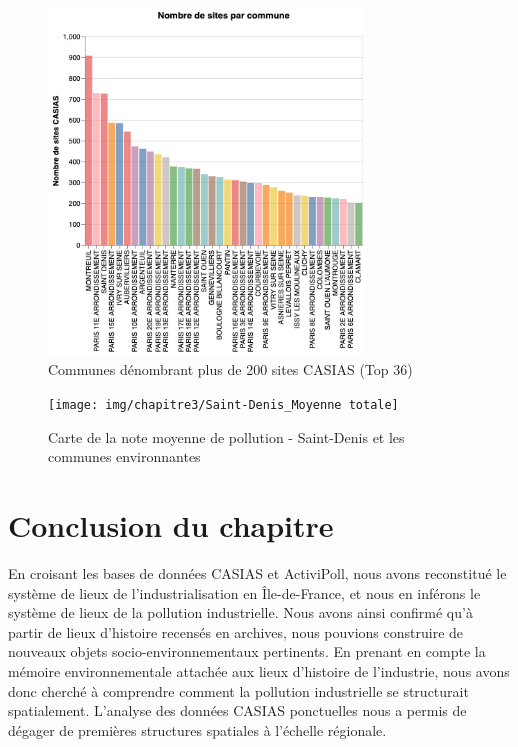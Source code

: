 \documentclass[a4paper,twoside,12pt]{book}
\begin{document}
\begin{figure}[!h]
\centering 
\includegraphics[width=0.75\textwidth]{img/chapitre3/CASIAS_Nb_Sites_par_Commune_Sup200_Top36.png}
\caption{Communes dénombrant plus de 200 sites CASIAS (Top 36)}
\label{fig:casias_top_communes}
\end{figure}


\begin{figure}[!h]
\centering 
\texttt{[image: img/chapitre3/Saint-Denis\_Moyenne totale]}
\caption{Carte de la note moyenne de pollution - Saint-Denis et les communes environnantes}
\label{fig:carte_points_STD}
\end{figure}



\section{Conclusion du chapitre}
En croisant les bases de données CASIAS et ActiviPoll, nous avons reconstitué le système de lieux de l'industrialisation  en Île-de-France, et nous en inférons le système de lieux de la pollution industrielle. Nous avons ainsi confirmé qu'à partir de lieux d'histoire recensés en archives, nous pouvions construire de nouveaux objets socio-environnementaux pertinents.  En prenant en compte la mémoire environnementale attachée aux lieux d'histoire de l'industrie, nous avons donc cherché à comprendre comment la pollution industrielle  se structurait spatialement. L'analyse des données CASIAS ponctuelles nous a permis de dégager de premières structures spatiales à l'échelle régionale. 
\end{document}
